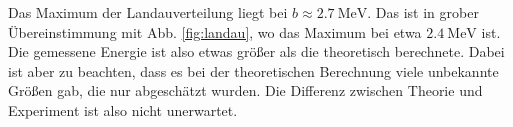 Das Maximum der Landauverteilung liegt bei $b \approx \SI{2.7}{\mega\eV}$. Das ist in grober Übereinstimmung mit Abb. \ref{fig:landau}, wo das Maximum bei etwa $\SI{2.4}{\mega\eV}$ ist. Die gemessene Energie ist also etwas größer als die theoretisch berechnete. Dabei ist aber zu beachten, dass es bei der theoretischen Berechnung viele unbekannte Größen gab, die nur abgeschätzt wurden. Die Differenz zwischen Theorie und Experiment ist also nicht unerwartet.
